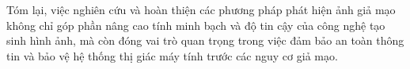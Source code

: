 
Tóm lại, việc nghiên cứu và hoàn thiện các phương pháp phát hiện ảnh giả mạo không chỉ góp phần nâng cao tính minh bạch và độ tin cậy của công nghệ tạo sinh hình ảnh, mà còn đóng vai trò quan trọng trong việc đảm bảo an toàn thông tin và bảo vệ hệ thống thị giác máy tính trước các nguy cơ giả mạo.

%
%

